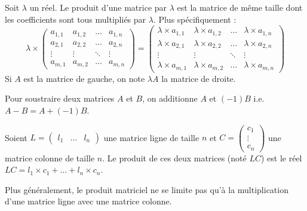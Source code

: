 	\begin{formula}
		Soit $\lambda$ un réel. Le produit d'une matrice par $\lambda$ est la matrice de même taille dont les coefficients sont tous multipliés par $\lambda$. Plus spécifiquement :
		\[ \lambda \times \begin{pmatrix}a_{1,1} & a_{1,2} & \dots & a_{1,n} \\ a_{2,1} & a_{2,2} & \dots & a_{2,n} \\ \vdots & \vdots & \ddots & \vdots \\ a_{m,1} & a_{m,2} & \dots & a_{m,n}\end{pmatrix} = \begin{pmatrix}\lambda \times a_{1,1} & \lambda \times a_{1,2} & \dots & \lambda \times a_{1,n} \\ \lambda \times a_{2,1} & \lambda \times a_{2,2} & \dots & \lambda \times a_{2,n} \\ \vdots & \vdots & \ddots & \vdots \\ \lambda \times a_{m,1} & \lambda \times a_{m,2} & \dots & \lambda \times a_{m,n}\end{pmatrix} \]
		Si $A$ est la matrice de gauche, on note $\lambda A$ la matrice de droite.
	\end{formula}

	\begin{tip}
		Pour soustraire deux matrices $A$ et $B$, on additionne $A$ et $(-1)B$ i.e. $A - B = A + (-1)B$.
	\end{tip}

	\begin{formula}
		Soient $L = \begin{pmatrix}l_1 & ... & l_n\end{pmatrix}$ une matrice ligne de taille $n$ et $C = \begin{pmatrix}c_1 \\ \vdots \\ c_n\end{pmatrix}$ une matrice colonne de taille $n$.
		\newpar
		Le produit de ces deux matrices (noté $LC$) est le réel $LC = l_1 \times c_1 + \dots + l_n \times c_n$.
	\end{formula}

	Plus généralement, le produit matriciel ne se limite pas qu'à la multiplication d'une matrice ligne avec une matrice colonne.

